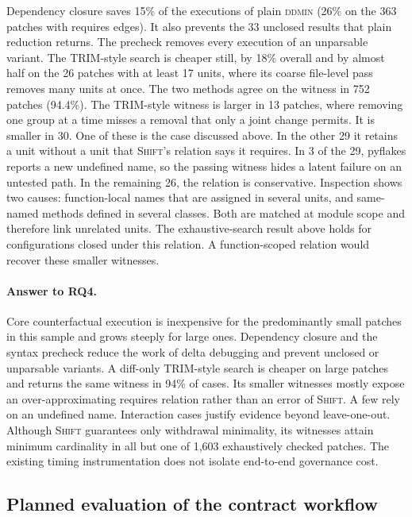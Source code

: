 \documentclass[a4paper,fleqn]{cas-sc}
\newcommand{\tool}{\textsc{Shift}}
\newcommand{\code}[1]{\texttt{\detokenize{#1}}}
\begin{document}
Dependency closure saves 15\% of the executions of plain \textsc{ddmin} (26\% on the 363 patches with requires edges). It also prevents the 33 unclosed results that plain reduction returns. The precheck removes every execution of an unparsable variant. The TRIM-style search is cheaper still, by 18\% overall and by almost half on the 26 patches with at least 17 units, where its coarse file-level pass removes many units at once. The two methods agree on the witness in 752 patches (94.4\%). The TRIM-style witness is larger in 13 patches, where removing one group at a time misses a removal that only a joint change permits. It is smaller in 30. One of these is the \code{sympy__sympy-19783} case discussed above. In the other 29 it retains a unit without a unit that \tool{}'s relation says it requires. In 3 of the 29, pyflakes reports a new undefined name, so the passing witness hides a latent failure on an untested path. In the remaining 26, the relation is conservative. Inspection shows two causes: function-local names that are assigned in several units, and same-named methods defined in several classes. Both are matched at module scope and therefore link unrelated units. The exhaustive-search result above holds for configurations closed under this relation. A function-scoped relation would recover these smaller witnesses.

\paragraph{Answer to RQ4.}
Core counterfactual execution is inexpensive for the predominantly small patches in this sample and grows steeply for large ones. Dependency closure and the syntax precheck reduce the work of delta debugging and prevent unclosed or unparsable variants. A diff-only TRIM-style search is cheaper on large patches and returns the same witness in 94\% of cases. Its smaller witnesses mostly expose an over-approximating requires relation rather than an error of \tool{}. A few rely on an undefined name. Interaction cases justify evidence beyond leave-one-out. Although \tool{} guarantees only withdrawal minimality, its witnesses attain minimum cardinality in all but one of 1,603 exhaustively checked patches. The existing timing instrumentation does not isolate end-to-end governance cost.

\subsection{Planned evaluation of the contract workflow}\label{sec:future}
\end{document}
